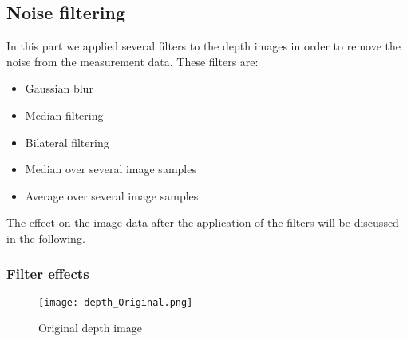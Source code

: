 \documentclass[DIV12,a4paper]{scrartcl}
\begin{document}
\subsection{Noise filtering}
\label{sec:filtering}
In this part we applied several filters to the depth images in order to remove the noise from the measurement data. These filters are:
\begin{itemize}
\item Gaussian blur
\item Median filtering
\item Bilateral filtering
\item Median over several image samples
\item Average over several image samples
\end{itemize}
The effect on the image data after the application of the filters will be discussed in the following.


\subsubsection{Filter effects}
\label{sec:filter_effects}
\begin{figure}[!htbp]
  \centering
  \texttt{[image: depth\_Original.png]}
  \caption{Original depth image}
  \label{fig:original_depth}
\end{figure}
\end{document}
